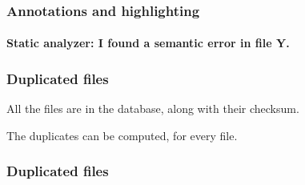 \documentclass{beamer}
\begin{document}
\begin{frame}
  \frametitle{Annotations and highlighting}
  \framesubtitle{\alert{Static analyzer}: I found a semantic error in
    file Y.}
\end{frame}

\begin{frame}
  \frametitle{Duplicated files}
  All the files are in the database, along with their checksum.

  The duplicates can be computed, for every file.

  \vspace{1cm}
\end{frame}

\begin{frame}
  \frametitle{Duplicated files}
\end{frame}
\end{document}
